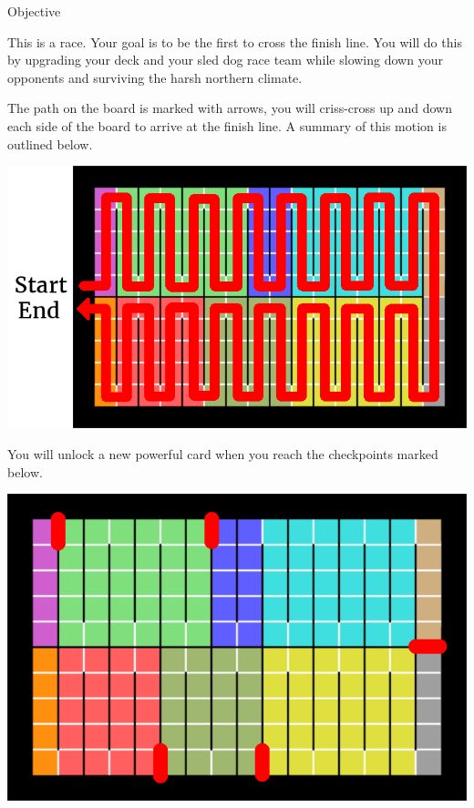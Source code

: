 \documentclass{article}
\begin{document}
\clearpage

{\noindent\Heading\Large Objective\par}

This is a race. Your goal is to be the first to cross the finish line. You will
do this by upgrading your deck and your sled dog race team while slowing down
your opponents and surviving the harsh northern climate.

The path on the board is marked with arrows, you will criss-cross up and down
each side of the board to arrive at the finish line. A summary of this motion is
outlined below.

{\centering\includegraphics{images/rules/board_order}\par}

You will unlock a new powerful card when you reach the checkpoints marked below.

{\centering\includegraphics{images/rules/checkpoints}\par}
\end{document}
